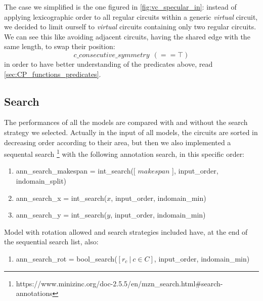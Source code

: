         The case we simplified is the one figured in \ref{fig:vc_specular_in}: instead of applying
        lexicographic order to all regular circuits within a generic \textit{virtual} circuit, we 
        decided to limit ourself to \textit{virtual} circuits containing only two regular circuits.
        We can see this like avoiding adjacent circuits, having the shared edge with the same length,
        to swap their position:
        \begin{equation*}
            c\_consecutive\_symmetry\ \ (== \top)
        \end{equation*}
        in order to have better understanding of the predicates above, read \ref{sec:CP_functions_predicates}.
        


        


\subsection{Search}
        The performances of all the models are compared with and without the search strategy we selected.
        Actually in the input of all models, the circuits are sorted in decreasing order according to their area,
        but then we also implemented a sequental search 
        \footnote[1]{https://www.minizinc.org/doc-2.5.5/en/mzn\_search.html\#search-annotations}
         with the following annotation search, in this specific order:
        \begin{enumerate}
            \item ann\_search\_makespan = int\_search([ $makespan$ ], input\_order, indomain\_split)
            \item ann\_search\_x = int\_search($x$, input\_order, indomain\_min)
            \item ann\_search\_y = int\_search($y$, input\_order, indomain\_min)
        \end{enumerate}

        Model with rotation allowed and search strategies included have, at the end of the sequential search 
        list, also:
        \begin{enumerate}[resume]
            \item ann\_search\_rot = bool\_search($[r_c\ |\ c \in C]$, input\_order, indomain\_min)
        \end{enumerate}

